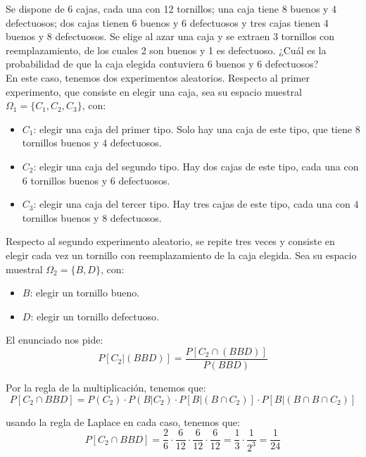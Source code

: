 \begin{ejercicio} \label{ej:4.Ejercicio10}
    Se dispone de 6 cajas, cada una con 12 tornillos; una caja tiene 8 buenos y 4 defectuosos; dos cajas tienen 6 buenos y 6 defectuosos y tres cajas tienen 4 buenos y 8 defectuosos. Se elige al azar una caja y se extraen 3 tornillos con reemplazamiento, de los cuales 2 son buenos y 1 es defectuoso. ¿Cuál es la probabilidad de que la caja elegida contuviera 6 buenos y 6 defectuosos?\\

    En este caso, tenemos dos experimentos aleatorios. Respecto al primer experimento, que consiste en elegir una caja, sea su espacio muestral $\Omega_1 = \{C_1, C_2, C_3\}$, con:
    \begin{itemize}
        \item $C_1$: elegir una caja del primer tipo. Solo hay una caja de este tipo, que tiene $8$ tornillos buenos y $4$ defectuosos.
        \item $C_2$: elegir una caja del segundo tipo. Hay dos cajas de este tipo, cada una con $6$ tornillos buenos y $6$ defectuosos.
        \item $C_3$: elegir una caja del tercer tipo. Hay tres cajas de este tipo, cada una con $4$ tornillos buenos y $8$ defectuosos.
    \end{itemize}

    Respecto al segundo experimento aleatorio, se repite tres veces y consiste en elegir cada vez un tornillo con reemplazamiento de la caja elegida. Sea su espacio muestral $\Omega_2 = \{B, D\}$, con:
    \begin{itemize}
        \item $B$: elegir un tornillo bueno.
        \item $D$: elegir un tornillo defectuoso.
    \end{itemize}

    El enunciado nos pide:
    \begin{equation*}
        P[C_2 | (BBD)] = \frac{P[C_2 \cap (BBD)]}{P(BBD)}
    \end{equation*}

    Por la regla de la multiplicación, tenemos que:
    \begin{equation*}
        P[C_2 \cap BBD] = P(C_2)\cdot P(B|C_2) \cdot P[B|(B\cap C_2)] \cdot P[B|(B\cap B\cap C_2)]
    \end{equation*}

    usando la regla de Laplace en cada caso, tenemos que:
    \begin{equation*}
        P[C_2 \cap BBD] = \frac{2}{6}\cdot \frac{6}{12}\cdot \frac{6}{12} \cdot \frac{6}{12} = \frac{1}{3}\cdot \frac{1}{2^3} = \frac{1}{24}
    \end{equation*}


\end{ejercicio}
